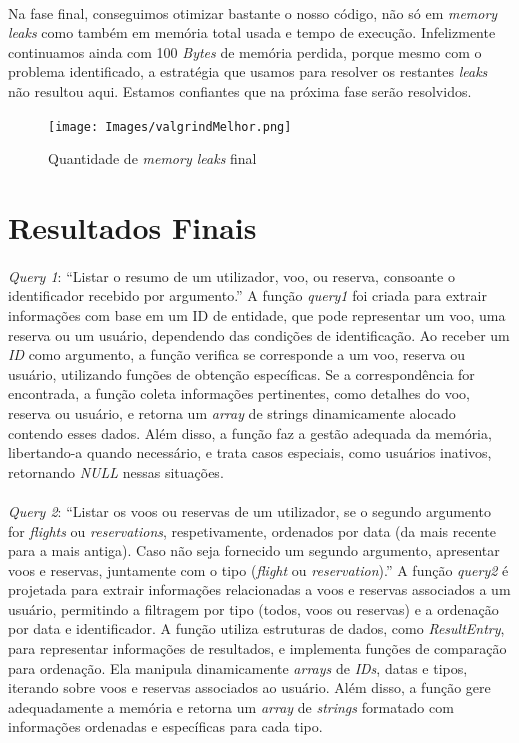 \documentclass{article}
\begin{document}
\paragraph{}Na fase final, conseguimos otimizar bastante o nosso código, não só em \textit{memory leaks} como também em memória total usada e tempo de execução. Infelizmente continuamos ainda com 100 \textit{Bytes} de memória perdida, porque mesmo com o problema identificado, a estratégia que usamos para resolver os restantes \textit{leaks} não resultou aqui. Estamos confiantes que na próxima fase serão resolvidos.
\begin{figure}[H]
\begin{center}
	\texttt{[image: Images/valgrindMelhor.png]} 
        \caption{Quantidade de \textit{memory leaks} final}
        \label{Figura3Valgrind}
\end{center}
\end{figure}
\newpage
\section{Resultados Finais}
\paragraph{}\textit{Query 1}: “Listar o resumo de um utilizador, voo, ou reserva, consoante o identificador recebido por argumento.”
A função \textit{query1} foi criada para extrair informações com base em um ID de entidade, que pode representar um voo, uma reserva ou um usuário, dependendo das condições de identificação. Ao receber um \textit{ID} como argumento, a função verifica se corresponde a um voo, reserva ou usuário, utilizando funções de obtenção específicas. Se a correspondência for encontrada, a função coleta informações pertinentes, como detalhes do voo, reserva ou usuário, e retorna um \textit{array} de strings dinamicamente alocado contendo esses dados. Além disso, a função faz a gestão adequada da memória, libertando-a quando necessário, e trata casos especiais, como usuários inativos, retornando \textit{NULL} nessas situações.
\paragraph{}\textit{Query 2}: “Listar os voos ou reservas de um utilizador, se o segundo argumento for \textit{flights} ou \textit{reservations}, respetivamente, ordenados por data (da mais recente para a mais antiga). Caso não seja fornecido um segundo argumento, apresentar voos e reservas, juntamente com o tipo (\textit{flight} ou \textit{reservation}).”
A função \textit{query2} é projetada para extrair informações relacionadas a voos e reservas associados a um usuário, permitindo a filtragem por tipo (todos, voos ou reservas) e a ordenação por data e identificador. A função utiliza estruturas de dados, como \textit{ResultEntry}, para representar informações de resultados, e implementa funções de comparação para ordenação. Ela manipula dinamicamente \textit{arrays} de \textit{IDs}, datas e tipos, iterando sobre voos e reservas associados ao usuário. Além disso, a função gere adequadamente a memória e retorna um \textit{array} de \textit{strings} formatado com informações ordenadas e específicas para cada tipo.
\end{document}
